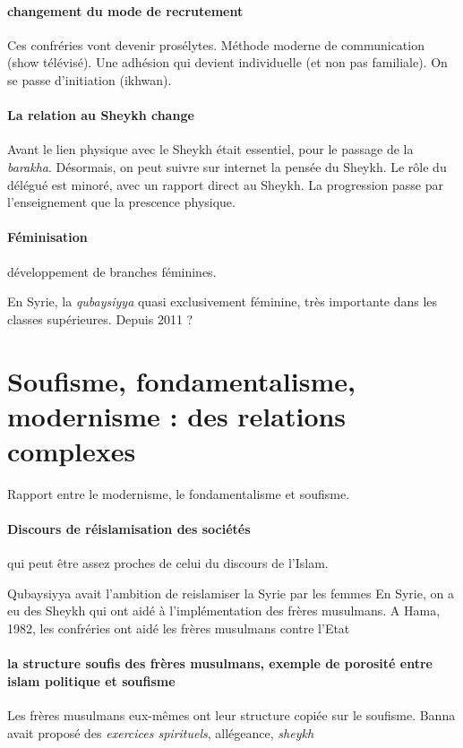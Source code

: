 \paragraph{changement du mode de recrutement} Ces confréries vont devenir prosélytes. Méthode moderne de communication (show télévisé). Une adhésion qui devient individuelle (et non pas familiale). On se passe d'initiation (ikhwan). 

\paragraph{La relation au Sheykh change} Avant le lien physique avec le Sheykh était essentiel, pour le passage de la \textit{barakha}. Désormais, on peut suivre sur internet la pensée du Sheykh. Le rôle du délégué est minoré, avec un rapport direct au Sheykh. La progression passe par l'enseignement que la prescence physique. 

\paragraph{Féminisation} développement de branches féminines. 
\begin{Ex}
En Syrie, la \textit{qubaysiyya} quasi exclusivement féminine, très importante dans les classes supérieures.
Depuis 2011 ?
\end{Ex}





\section{Soufisme, fondamentalisme, modernisme : des relations complexes}

Rapport entre le modernisme, le fondamentalisme et soufisme. 
\paragraph{Discours de réislamisation des sociétés} qui peut être assez proches de celui du discours de l'Islam. 
\begin{Ex}
Qubaysiyya avait l'ambition de reislamiser la Syrie par les femmes
En Syrie, on a eu des Sheykh qui ont aidé à l'implémentation des frères musulmans.
A Hama, 1982, les confréries ont aidé les frères musulmans contre l'Etat
\end{Ex}

\paragraph{la structure soufis des frères musulmans, exemple de porosité entre islam politique et soufisme}
Les frères musulmans eux-mêmes ont leur structure copiée sur le soufisme. Banna avait proposé des \textit{exercices spirituels}, allégeance, \textit{sheykh}

